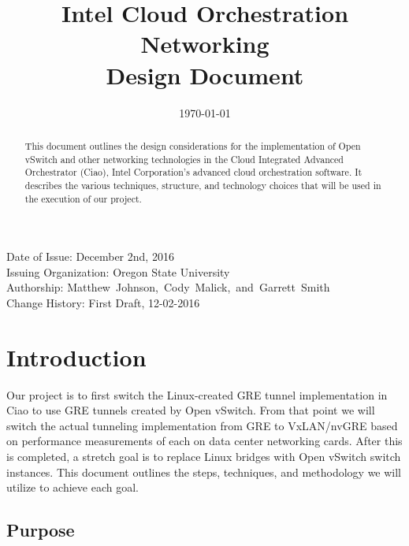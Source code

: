 \documentclass[10pt,onecolumn,journal,draftclsnofoot]{IEEEtran}
\begin{document}
\begin{titlepage}
	\title{Intel Cloud Orchestration Networking\\ Design Document}
	\date{\today}
	\maketitle
	\vspace{4cm}
	\begin{abstract}
		\noindent This document outlines the design considerations for
		the implementation of Open vSwitch and other networking
		technologies in the Cloud Integrated Advanced Orchestrator
		(Ciao), Intel Corporation's advanced cloud orchestration
		software. It describes the various techniques, structure, and
		technology choices that will be used in the execution of our
		project.
	\end{abstract}
	\vspace{6cm}
	\begin{center}
		Date of Issue: December 2nd, 2016\\
		Issuing Organization: Oregon State University\\
		Authorship: Matthew~Johnson,~Cody~Malick,~and~Garrett~Smith\\
		Change History: First Draft, 12-02-2016 \\
	\end{center}

\end{titlepage}
\tableofcontents
\clearpage

\section{Introduction}

Our project is to first switch the Linux-created GRE tunnel implementation in
Ciao to use GRE tunnels created by Open vSwitch. From that point we will switch
the actual tunneling implementation from GRE to VxLAN/nvGRE based on performance
measurements of each on data center networking cards. After this is completed, a
stretch goal is to replace Linux bridges with Open vSwitch switch instances.
This document outlines the steps, techniques, and methodology we will utilize to
achieve each goal.

\subsection{Purpose}
\end{document}
